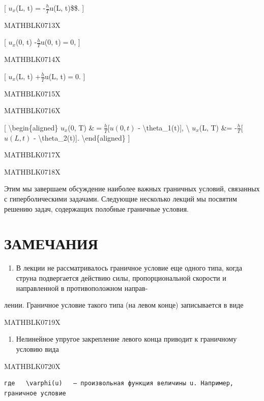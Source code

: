 \documentclass[
]{article}
\providecommand{\tightlist}{%
  \setlength{\itemsep}{0pt}\setlength{\parskip}{0pt}}
\begin{document}
{{{[} \(u_{x}\)(L, t) = -\(\frac{h}{T}\)u(L, t)\$\$. {]}

MATHBLK0713X

{[} \(u_{x}\)(0, t) -\(\frac{h}{T}\)u(0, t)\(= 0\), {]}

MATHBLK0714X

{[} \(u_{x}\)(L, t) +\(\frac{h}{T}\)u(L, t)\(= 0\). {]}

MATHBLK0715X

MATHBLK0716X

{[} \textbackslash begin\{aligned\} \(u_x\)(0, T)
\&\(= \frac{h}{T}\){[}\(u(0, t)\) - \textbackslash theta\_1(t){]},
\textbackslash{} \(u_x\)(L, T) \&= -\(\frac{h}{T}\){[}\(u(L, t)\) -
\textbackslash theta\_2(t){]}. \textbackslash end\{aligned\} {]}

MATHBLK0717X

MATHBLK0718X

Этим мы завершаем обсуждение наиболее важных граничных условий,
связанных с гиперболическими задачами. Следующие несколько лекций мы
посвятим решению задач, содержащих полобные граничные условия.

\section{ЗАМЕЧАНИЯ}\label{ux437ux430ux43cux435ux447ux430ux43dux438ux44f-4}

\begin{enumerate}
\def\labelenumi{\arabic{enumi}.}
\tightlist
\item
  В лекции не рассматривалось граничное условие еще одного типа, когда
  струна подвергается действию силы, пропорциональной скорости и
  направленной в противоположном направ-
\end{enumerate}

лении. Граничное условие такого типа (на левом конце) записывается в
виде

MATHBLK0719X

\begin{enumerate}
\def\labelenumi{\arabic{enumi}.}
\setcounter{enumi}{1}
\tightlist
\item
  Нелинейное упругое закрепление левого конца приводит к граничному
  условию вида
\end{enumerate}

MATHBLK0720X

\begin{verbatim}
где   \varphi(u)   — произвольная функция величины u. Например, граничное условие
\end{verbatim}

}}
\end{document}
